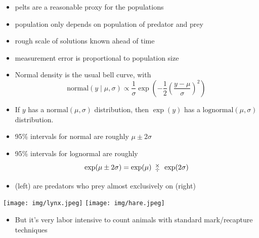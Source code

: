 \documentclass[9pt]{report}
\begin{document}
\begin{itemize}
\item pelts are a reasonable proxy for the populations 
\item population only depends on population of predator and prey 
\item rough scale of solutions known ahead of time 
\item measurement error is proportional to population size 
\end{itemize}


\begin{itemize}
\item Normal density is the usual bell curve, with
  \[
    \textrm{normal}(y \mid \mu, \sigma) \propto \frac{1}{\sigma} \exp\left(-\frac{1}{2}
      \left( \frac{y - \mu}{\sigma} \right)^2\right)
  \]
\item If $y$ has a $\textrm{normal}(\mu, \sigma)$ distribution, then
  $\exp(y)$ has a $\textrm{lognormal}(\mu, \sigma)$ distribution.
\item 95\% intervals for normal are roughly $\mu \pm 2\sigma$
\item 95\% intervals for lognormal are roughly
  \[
    \exp(\mu \pm 2\sigma) = \exp(\mu) 
  {\footnotesize \begin{array}{c} \times \\[-4pt]
    \div \end{array}} \exp(2\sigma)
  \]
\end{itemize}


\begin{itemize}
  \item {} (left) are predators who prey almost exclusively on
     (right) 
\end{itemize}
\begin{center}
  \texttt{[image: img/lynx.jpeg]}
  \quad
  \texttt{[image: img/hare.jpeg]}
\end{center}
\begin{itemize}
  \item But it's very labor intensive to count animals with standard
    mark/recapture techniques
\end{itemize}
\end{document}
